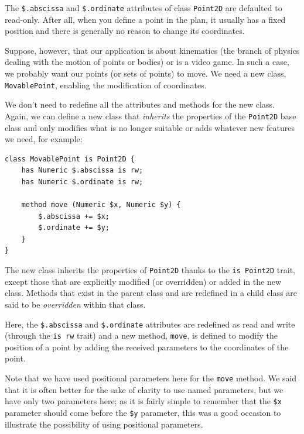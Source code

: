 The \verb'$.abscissa' and \verb'$.ordinate' attributes of 
class {\tt Point2D} are defaulted to read-only. After all, 
when you define a point in the plan, it usually has a fixed 
position and there is generally no reason to change its 
coordinates.

Suppose, however, that our application is about kinematics 
(the branch of physics dealing with the motion of points or 
bodies) or is a video game. In such a case, we probably want 
our points (or sets of points) to move. We need a new class, 
{\tt MovablePoint}, enabling the modification of coordinates.

We don't need to redefine all the attributes and methods for 
the new class. Again, we can define a new class that 
\emph{inherits} the properties of the {\tt Point2D} base class 
and only modifies what is no longer suitable or adds whatever 
new features we need, for example:

\begin{verbatim}
class MovablePoint is Point2D {
    has Numeric $.abscissa is rw;
    has Numeric $.ordinate is rw;
    
    method move (Numeric $x, Numeric $y) {
        $.abscissa += $x;
        $.ordinate += $y;
    }
}
\end{verbatim}

The new class inherits the properties of {\tt Point2D} thanks 
to the {\tt is Point2D} trait, except those that are explicitly 
modified (or overridden) or added in the new class. 
Methods that exist in the parent class and are 
redefined in a child class are said to be \emph{overridden} 
within that class. 

Here, the \verb'$.abscissa' and \verb'$.ordinate' attributes are 
redefined as read and write (through the {\tt is rw} trait) and 
a new method, {\tt move}, is defined to modify the position of 
a point by adding the received parameters to the coordinates 
of the point.

Note that we have used positional parameters here for the 
{\tt move} method. We said that it is often better for the sake of clarity 
to use named parameters, but we have only two parameters here; 
as it is fairly simple to remember that the \verb'$x' 
parameter should come before the \verb'$y' parameter, this 
was a good occasion to illustrate the possibility of using 
positional parameters.

